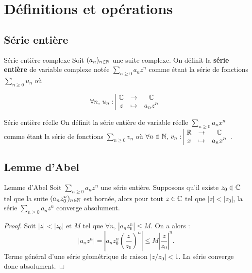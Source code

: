 \section{Définitions et opérations }
\subsection{Série entière }

\begin{definition}{Série entière complexe}{}
    Soit $(a_n)_{n\in\mathbb{N}}$ une suite complexe. On définit la \textbf{série entière} de variable 
    complexe notée $\displaystyle \sum_{n \geqslant 0} a_n z^n$ comme étant la série de fonctions 
    $\displaystyle \sum_{n \geqslant 0} u_n$ où 
    
    $$\forall n, \, u_n: \space \begin{array}{|ccc} \displaystyle \mathbb{C} & \to & \displaystyle \mathbb{C} \\ \displaystyle z & \mapsto & \displaystyle a_n z^n \end{array}$$
\end{definition}

\begin{definition}{Série entière réelle}{}
    On définit la série entière de variable réelle $\displaystyle \sum_{n \geqslant 0} a_n x^n$ comme étant la série de fonctions
    $\displaystyle \sum_{n \geqslant 0} v_n$ où $\forall n \in \mathbb{N}, \, v_n: \space \begin{array}{|ccc} \displaystyle \mathbb{R} & \to & \displaystyle \mathbb{C} \\ \displaystyle x & \mapsto & \displaystyle a_n x^n \end{array}$.
\end{definition}

\subsection{Lemme d'Abel}

\begin{proposition}{Lemme d'Abel}{}
    Soit $\sum_{n \geqslant 0 } a_n z^n $ une série entière. Supposons qu'il existe 
    $z_0 \in \mathbb{C}$ tel que la suite $(a_n z_0^n)_{n \in \mathbb{N}}$ est bornée, alors 
    pour tout $z \in \mathbb{C}$ tel que $|z| < |z_0|$, la série $\sum_{n \geqslant 0} a_n z^n$ converge absolument.
\end{proposition}


\begin{proof}
    Soit $|z| < |z_0|$ et $M$ tel que $\forall n, \, |a_n z_0^n| \leqslant M$. On a alors :
    \[
        |a_n z^n| = \left| a_n z_0^n \left( \frac{z}{z_0} \right)^n \right| \leqslant M \left| \frac{z}{z_0} \right|^n.
    \]
    Terme général d'une série géométrique de raison $|z/z_0| < 1$. La série converge donc absolument.
\end{proof}

